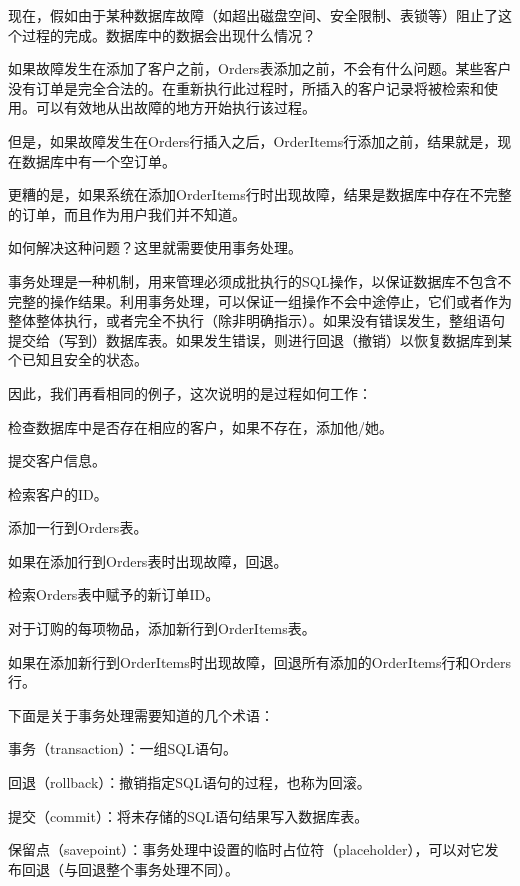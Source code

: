 现在，假如由于某种数据库故障（如超出磁盘空间、安全限制、表锁等）阻止了这个过程的完成。数据库中的数据会出现什么情况？

如果故障发生在添加了客户之前，Orders表添加之前，不会有什么问题。某些客户没有订单是完全合法的。在重新执行此过程时，所插入的客户记录将被检索和使用。可以有效地从出故障的地方开始执行该过程。

但是，如果故障发生在Orders行插入之后，OrderItems行添加之前，结果就是，现在数据库中有一个空订单。

更糟的是，如果系统在添加OrderItems行时出现故障，结果是数据库中存在不完整的订单，而且作为用户我们并不知道。

如何解决这种问题？这里就需要使用事务处理。

事务处理是一种机制，用来管理必须成批执行的SQL操作，以保证数据库不包含不完整的操作结果。利用事务处理，可以保证一组操作不会中途停止，它们或者作为整体整体执行，或者完全不执行（除非明确指示）。如果没有错误发生，整组语句提交给（写到）数据库表。如果发生错误，则进行回退（撤销）以恢复数据库到某个已知且安全的状态。

因此，我们再看相同的例子，这次说明的是过程如何工作：

\begin{compactenum}
\item 检查数据库中是否存在相应的客户，如果不存在，添加他/她。
\item 提交客户信息。
\item 检索客户的ID。
\item 添加一行到Orders表。
\item 如果在添加行到Orders表时出现故障，回退。
\item 检索Orders表中赋予的新订单ID。
\item 对于订购的每项物品，添加新行到OrderItems表。
\item 如果在添加新行到OrderItems时出现故障，回退所有添加的OrderItems行和Orders行。
\end{compactenum}

下面是关于事务处理需要知道的几个术语：

\begin{compactitem}
\item 事务（transaction）：一组SQL语句。
\item 回退（rollback）：撤销指定SQL语句的过程，也称为回滚。
\item 提交（commit）：将未存储的SQL语句结果写入数据库表。
\item 保留点（savepoint）：事务处理中设置的临时占位符（placeholder），可以对它发布回退（与回退整个事务处理不同）。
\end{compactitem}

